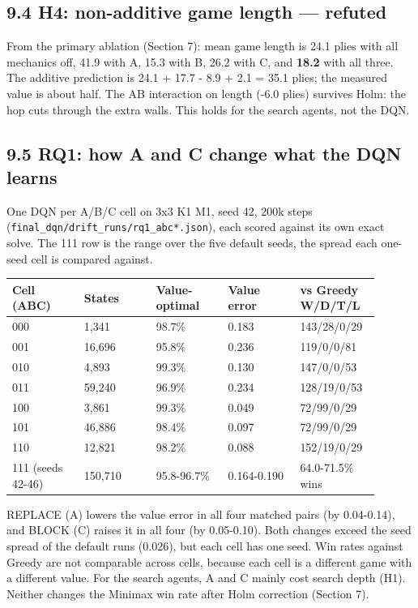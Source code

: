 \documentclass[11pt]{article}
\begin{document}
\subsection{9.4 H4: non-additive game length — refuted}

From the primary ablation (Section 7): mean game length is 24.1 plies with all mechanics off,
41.9 with A, 15.3 with B, 26.2 with C, and \textbf{18.2} with all three. The additive prediction is
24.1 + 17.7 - 8.9 + 2.1 = 35.1 plies; the measured value is about half. The AB interaction on
length (-6.0 plies) survives Holm: the hop cuts through the extra walls. This holds for the
search agents, not the DQN.

\subsection{9.5 RQ1: how A and C change what the DQN learns}

One DQN per A/B/C cell on 3x3 K1 M1, seed 42, 200k steps (\texttt{final\_dqn/drift\_runs/rq1\_abc*.json}),
each scored against its own exact solve. The 111 row is the range over the five default seeds,
the spread each one-seed cell is compared against.

\begin{center}\scriptsize
\begin{longtable}{p{0.18\linewidth}p{0.18\linewidth}p{0.18\linewidth}p{0.18\linewidth}p{0.18\linewidth}}
\toprule
Cell (ABC) & States & Value-optimal & Value error & vs Greedy W/D/T/L \\
\midrule
000 & 1,341 & 98.7\% & 0.183 & 143/28/0/29 \\
001 & 16,696 & 95.8\% & 0.236 & 119/0/0/81 \\
010 & 4,893 & 99.3\% & 0.130 & 147/0/0/53 \\
011 & 59,240 & 96.9\% & 0.234 & 128/19/0/53 \\
100 & 3,861 & 99.3\% & 0.049 & 72/99/0/29 \\
101 & 46,886 & 98.4\% & 0.097 & 72/99/0/29 \\
110 & 12,821 & 98.2\% & 0.088 & 152/19/0/29 \\
111 (seeds 42-46) & 150,710 & 95.8-96.7\% & 0.164-0.190 & 64.0-71.5\% wins \\
\bottomrule
\end{longtable}
\end{center}

REPLACE (A) lowers the value error in all four matched pairs (by 0.04-0.14), and BLOCK (C)
raises it in all four (by 0.05-0.10). Both changes exceed the seed spread of the default runs
(0.026), but each cell has one seed. Win rates against Greedy are not comparable across cells,
because each cell is a different game with a different value. For the search agents, A and C
mainly cost search depth (H1). Neither changes the Minimax win rate after Holm correction
(Section 7).
\end{document}
